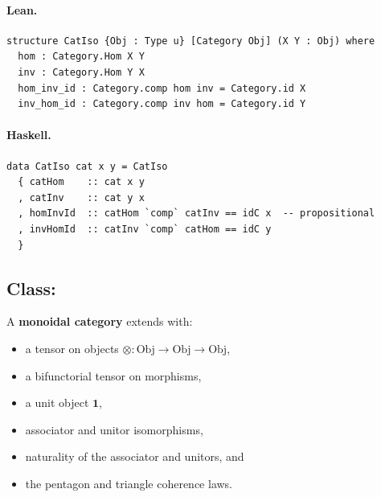 \documentclass[11pt,a4paper]{article}
\begin{document}
\paragraph{Lean.}
\begin{lstlisting}[style=lean]
structure CatIso {Obj : Type u} [Category Obj] (X Y : Obj) where
  hom : Category.Hom X Y
  inv : Category.Hom Y X
  hom_inv_id : Category.comp hom inv = Category.id X
  inv_hom_id : Category.comp inv hom = Category.id Y
\end{lstlisting}

\paragraph{Haskell.}
\begin{lstlisting}[style=haskell]
data CatIso cat x y = CatIso
  { catHom    :: cat x y
  , catInv    :: cat y x
  , homInvId  :: catHom `comp` catInv == idC x  -- propositional
  , invHomId  :: catInv `comp` catHom == idC y
  }
\end{lstlisting}


\subsection{Class: }

\begin{defn}
A \textbf{monoidal category} extends  with:
\begin{itemize}
  \item a tensor on objects $\otimes : \mathrm{Obj} \to \mathrm{Obj} \to \mathrm{Obj}$,
  \item a bifunctorial tensor on morphisms,
  \item a unit object $\mathbf{1}$,
  \item associator and unitor isomorphisms,
  \item naturality of the associator and unitors, and
  \item the pentagon and triangle coherence laws.
\end{itemize}
\end{defn}
\end{document}
